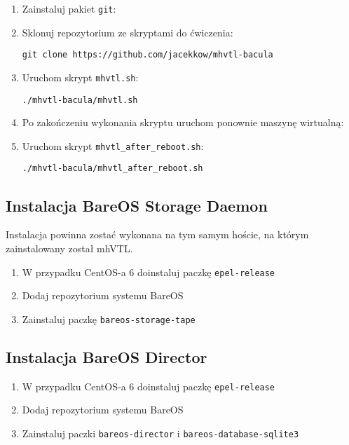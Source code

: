 \documentclass[polish]{article}
\begin{document}
\begin{enumerate}
\item Zainstaluj pakiet \texttt{git}:
\item Sklonuj repozytorium ze skryptami do ćwiczenia:
\begin{verbatim}
git clone https://github.com/jacekkow/mhvtl-bacula
\end{verbatim}
\item Uruchom skrypt \texttt{mhvtl.sh}:
\begin{verbatim}
./mhvtl-bacula/mhvtl.sh
\end{verbatim}
\item Po zakończeniu wykonania skryptu uruchom ponownie maszynę wirtualną:
\item Uruchom skrypt \texttt{mhvtl\_after\_reboot.sh}:
\begin{verbatim}
./mhvtl-bacula/mhvtl_after_reboot.sh
\end{verbatim}

\end{enumerate}

\subsection*{Instalacja BareOS Storage Daemon}

Instalacja powinna zostać wykonana na tym samym hoście,
na którym zainstalowany został mhVTL.

\begin{enumerate}

\item W przypadku CentOS-a 6 doinstaluj paczkę \texttt{epel-release}

\item Dodaj repozytorium systemu BareOS

\item Zainstaluj paczkę \texttt{bareos-storage-tape}

\end{enumerate}

\subsection*{Instalacja BareOS Director}

\begin{enumerate}

\item W przypadku CentOS-a 6 doinstaluj paczkę \texttt{epel-release}

\item Dodaj repozytorium systemu BareOS

\item Zainstaluj paczki \texttt{bareos-director} i \texttt{bareos-database-sqlite3}

\end{enumerate}
\end{document}
